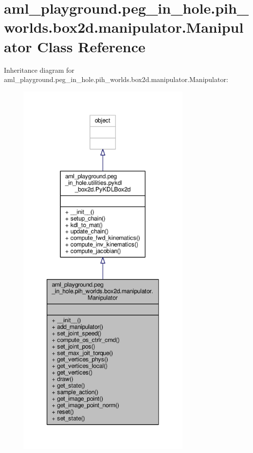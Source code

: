 \hypertarget{classaml__playground_1_1peg__in__hole_1_1pih__worlds_1_1box2d_1_1manipulator_1_1_manipulator}{\section{aml\-\_\-playground.\-peg\-\_\-in\-\_\-hole.\-pih\-\_\-worlds.\-box2d.\-manipulator.\-Manipulator Class Reference}
\label{classaml__playground_1_1peg__in__hole_1_1pih__worlds_1_1box2d_1_1manipulator_1_1_manipulator}
}


Inheritance diagram for aml\-\_\-playground.\-peg\-\_\-in\-\_\-hole.\-pih\-\_\-worlds.\-box2d.\-manipulator.\-Manipulator\-:
\nopagebreak
\begin{figure}[H]
\begin{center}
\leavevmode
\includegraphics[height=550pt]{classaml__playground_1_1peg__in__hole_1_1pih__worlds_1_1box2d_1_1manipulator_1_1_manipulator__inherit__graph}
\end{center}
\end{figure}


